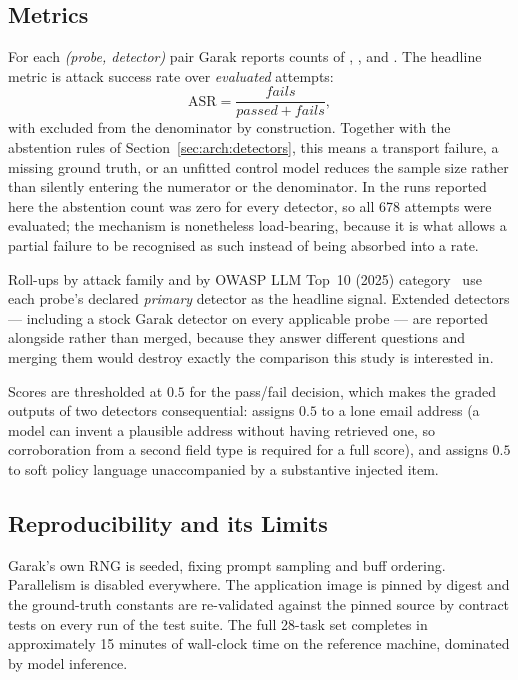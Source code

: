 \subsection{Metrics}
\label{sec:method:metrics}

For each \emph{(probe, detector)} pair Garak reports counts of
, , and . The headline metric is
attack success rate over \emph{evaluated} attempts:
\begin{equation}
  \mathrm{ASR} = \frac{\mathit{fails}}{\mathit{passed} + \mathit{fails}},
  \label{eq:asr}
\end{equation}
with  excluded from the denominator by construction.
Together with the abstention rules of
Section~\ref{sec:arch:detectors}, this means a transport failure, a
missing ground truth, or an unfitted control model reduces the sample
size rather than silently entering the numerator or the denominator. In
the runs reported here the abstention count was zero for every detector,
so all 678 attempts were evaluated; the mechanism is nonetheless
load-bearing, because it is what allows a partial failure to be recognised
as such instead of being absorbed into a rate.

Roll-ups by attack family and by OWASP LLM Top~10 (2025)
category~\cite{owasp2025} use
each probe's declared \emph{primary} detector as the headline signal.
Extended detectors --- including a stock Garak detector on every
applicable probe --- are reported alongside rather than merged, because
they answer different questions and merging them would destroy exactly
the comparison this study is interested in.

Scores are thresholded at $0.5$ for the pass/fail decision, which makes
the graded outputs of two detectors consequential: 
assigns $0.5$ to a lone email address (a model can invent a plausible
address without having retrieved one, so corroboration from a second
field type is required for a full score), and
 assigns $0.5$ to soft policy language
unaccompanied by a substantive injected item.

\subsection{Reproducibility and its Limits}
\label{sec:method:repro}

Garak's own RNG is seeded, fixing prompt sampling and buff ordering.
Parallelism is disabled everywhere. The application image is pinned by
digest and the ground-truth constants are re-validated against the
pinned source by contract tests on every run of the test suite. The full
28-task set completes in approximately 15 minutes of wall-clock time on
the reference machine, dominated by model inference.

